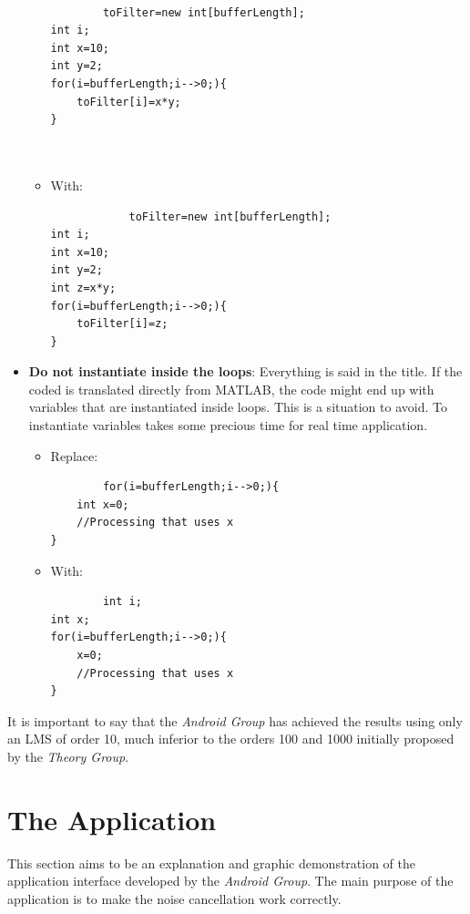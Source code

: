 \documentclass[11pt,a4paper,english]{book}  %
\theoremstyle{definition}  %
\theoremstyle{plain}  %
\theoremstyle{remark}  %
\begin{document}
\begin{itemize}
\begin{itemize}
		\begin{lstlisting}
	
		toFilter=new int[bufferLength];
int i;
int x=10;
int y=2;
for(i=bufferLength;i-->0;){
	toFilter[i]=x*y;
}
	
		
		\end{lstlisting}
		
		\item With:
		
			\begin{lstlisting}
			toFilter=new int[bufferLength];
int i;
int x=10;
int y=2;
int z=x*y;
for(i=bufferLength;i-->0;){
	toFilter[i]=z;
}

			\end{lstlisting}
	\end{itemize}
	
	\item \textbf{Do not instantiate inside the loops}: Everything is said in the title. If the coded is translated directly from MATLAB, the code might end up with variables that are instantiated inside loops. This is a situation to avoid. To instantiate variables takes some precious time for real time application.
	
	\begin{itemize}
	\item Replace:
		\begin{lstlisting}
		for(i=bufferLength;i-->0;){
	int x=0;
	//Processing that uses x
}

		\end{lstlisting}
	\item With:
	
		\begin{lstlisting}
		int i;
int x;
for(i=bufferLength;i-->0;){
	x=0;
	//Processing that uses x
}

		\end{lstlisting}
		\end{itemize}

	
		\end{itemize}
	
	It is important to say that the \textit{Android Group} has achieved the results using only an LMS of order 10, much inferior to the orders 100 and 1000 initially proposed by the \textit{Theory Group}.

	
	\section{The Application}
	
	This section aims to be an explanation and graphic demonstration of the application interface developed by the \textit{Android Group}. The main purpose of the application is to make the noise cancellation work correctly.
	
\end{document}
